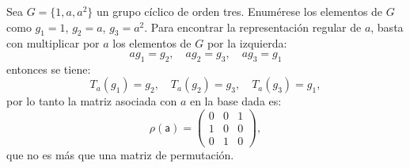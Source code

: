 \begin{ejemplo}
Sea $G = \{ 1,a,a^2 \}$ un grupo cíclico de orden tres. Enumérese los elementos de $G$ como $g_1 = 1$, $g_2 = a$, $g_3 = a^2$. Para encontrar la representación regular de $a$, basta con multiplicar por $a$ los elementos de $G$ por la izquierda:
\begin{equation*}  
ag_1 = g_2, \quad ag_2 = g_3, \quad ag_3 = g_1 
\end{equation*} entonces se tiene:
\begin{equation*}  T_a(g_1) = g_2, \quad T_a(g_2) = g_3, \quad T_a(g_3) = g_1, \end{equation*} por lo tanto la matriz asociada con $a$ en la base dada es:
\begin{equation*} \mathsf{\rho(a)} =  \begin{pmatrix}
0 & 0 & 1 \\
1 & 0 & 0 \\
0 & 1 & 0
\end{pmatrix},  \end{equation*} que no es más que una matriz de permutación.
\end{ejemplo}
